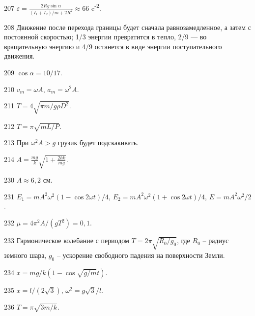 \begin{Answer}{207}
$\varepsilon = \frac{2Rg \sin \alpha}{(I_1 + I_2)/m + 2R^2} \approx 66$ c\textsuperscript{-2}.
\end{Answer}
\begin{Answer}{208}
Движение после перехода границы будет сначала равнозамедленное, а затем с постоянной скоростью; 1/3 энергии превратится в тепло, 2/9 — во вращательную энергию и 4/9 останется в виде энергии поступательного движения.
\end{Answer}
\begin{Answer}{209}
$\cos \alpha = 10/17$.
\end{Answer}
\begin{Answer}{210}
$v_m = \omega A$, $a_m = \omega^2 A$.
\end{Answer}
\begin{Answer}{211}
$T = 4 \sqrt{\pi m / g \rho D^2}$.
\end{Answer}
\begin{Answer}{212}
$T = \pi \sqrt{m L /P}$.
\end{Answer}
\begin{Answer}{213}
При $\omega^2 A > g$ грузик будет подскакивать.
\end{Answer}
\begin{Answer}{214}
$A = \frac{mg}{k}\sqrt{ 1 + \frac{2hk}{mg}}$.
\end{Answer}
\begin{Answer}{230}
$A \approx 6,2$ см.
\end{Answer}
\begin{Answer}{231}
$E_1 = m A^2 \omega^2 (1 - \cos 2 \omega t)/4$, $E_2 = m A^2 \omega^2 (1 + \cos 2 \omega t)/4$, $E = m A^2 \omega^2 /2$.
\end{Answer}
\begin{Answer}{232}
$\mu = 4 \pi^2 A / (gT^2) = 0,1$.
\end{Answer}
\begin{Answer}{233}
Гармоническое колебание с периодом $T = 2 \pi \sqrt{R_0 / g_0}$, где $R_0$ -- радиус земного шара, $g_0$ -- ускорение свободного падения на поверхности Земли.
\end{Answer}
\begin{Answer}{234}
$x = mg/k(1-\cos \sqrt{g/m} t)$.
\end{Answer}
\begin{Answer}{235}
$x = l/(2\sqrt{3})$, $\omega^2 = g\sqrt{3} / l$.
\end{Answer}
\begin{Answer}{236}
$T =  \pi\sqrt{3m/k}$.
\end{Answer}
